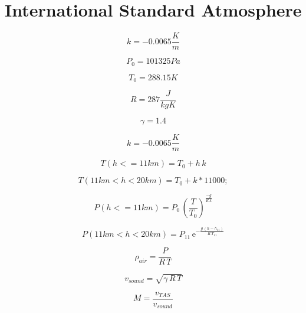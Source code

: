 \documentclass[lettersize,journal]{IEEEtran}
\begin{document}
{\newpage

\section{International Standard Atmosphere}\label{apdx:ISA}

\begin{equation}
k=-0.0065\frac{K}{m}
\end{equation}

\begin{equation}
P_{0}=101325Pa
\end{equation}

\begin{equation}
T_{0}=288.15K
\end{equation}

\begin{equation}
R=287\frac{J}{kgK}
\end{equation}

\begin{equation}
\gamma=1.4
\end{equation}

\begin{equation}
k=-0.0065\frac{K}{m}
\end{equation}

\begin{equation}
T(h <= 11 km)=T_{0}+h\,k
\end{equation}

\begin{equation}
T(11 km < h < 20 km)=T_0 + k*11000;
\end{equation}

\begin{equation}
P(h <= 11 km)=P_{0}\,\left(\frac{T}{T_{0}}\right)^{\frac{-g}{R\,k}}
\end{equation}

\begin{equation}
P(11 km < h < 20 km)=P_{11}\,{\mathrm{e}}^{-\frac{g\,\left(h-h_{11}\right)}{R\,T_{11}}}
\end{equation}

\begin{equation}
\rho_{air}=\frac{P}{R\,T}
\end{equation}

\begin{equation}
v_{sound}=\sqrt{\gamma\,R\,T}
\end{equation}

\begin{equation}
M=\frac{v_{TAS}}{v_{sound}}
\end{equation}

}
\end{document}
